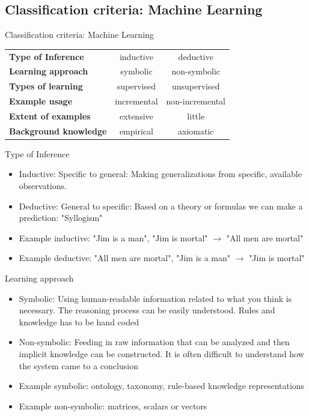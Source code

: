\documentclass{beamer}
\begin{document}
    

	
\subsection{Classification criteria: Machine Learning}
	\begin{frame}{Classification criteria: Machine Learning}
		 \begin{tabular}{lcc}
		 	\hline
			\textbf{Type of Inference}	& inductive 	& deductive\\
			\textbf{Learning approach}	& symbolic	 	& non-symbolic\\
			\textbf{Types of learning}	& supervised	& unsupervised\\
			\textbf{Example usage}		& incremental	& non-incremental\\
			\textbf{Extent of examples}	& extensive		& little\\
			\textbf{Background knowledge}& empirical	 	& axiomatic\\
			\hline
		 \end{tabular}
	\end{frame}
	
	\begin{frame}{Type of Inference}
		\begin{itemize}
			\item Inductive: Specific to general: Making generalizations from specific, available observations.
			\item Deductive: General to specific: Based on a theory or formulas we can make a prediction: "Syllogism"
			\newline
			\item Example inductive: {"Jim is a man", "Jim is mortal"} $\rightarrow$ "All men are mortal"
			\item Example deductive: {"All men are mortal", "Jim is a man"} $\rightarrow$ "Jim is mortal"
		\end{itemize}
	\end{frame}

	\begin{frame}{Learning approach}
    \begin{small}
		\begin{itemize}
			\item Symbolic: Using human-readable information related to what you think is necessary. The reasoning process can be easily understood. Rules and knowledge has to be hand coded
			\item Non-symbolic: Feeding in raw information that can be analyzed and then implicit knowledge can be constructed. It is often difficult to understand how the system came to a conclusion
			\newline
			\item Example symbolic: ontology, taxonomy, rule-based knowledge representations
			\item Example non-symbolic: matrices, scalars or vectors
		\end{itemize}
        \end{small}
	\end{frame}
\end{document}
